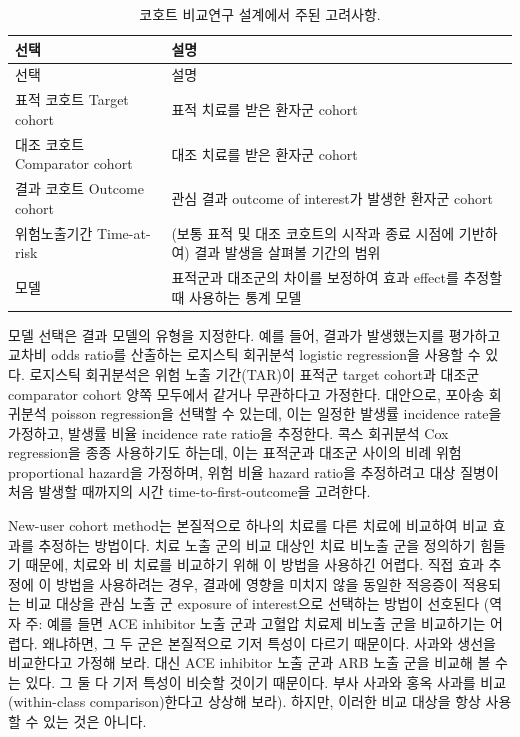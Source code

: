 \documentclass[10.5pt]{book}
\theoremstyle{definition}
\theoremstyle{definition}
\theoremstyle{definition}
\theoremstyle{remark}
\let\BeginKnitrBlock\begin \let\EndKnitrBlock\end
\begin{document}
\begin{longtable}[]{@{}ll@{}}
\caption{\label{tab:cmChoices} 코호트 비교연구 설계에서 주된
고려사항.}\tabularnewline
\toprule
선택 & 설명\tabularnewline
\midrule
\endfirsthead
\toprule
선택 & 설명\tabularnewline
\midrule
\endhead
표적 코호트 Target cohort & 표적 치료를 받은 환자군
cohort\tabularnewline
대조 코호트 Comparator cohort & 대조 치료를 받은 환자군
cohort\tabularnewline
결과 코호트 Outcome cohort & 관심 결과 outcome of interest가 발생한
환자군 cohort\tabularnewline
위험노출기간 Time-at-risk & (보통 표적 및 대조 코호트의 시작과 종료
시점에 기반하여) 결과 발생을 살펴볼 기간의 범위\tabularnewline
모델 & 표적군과 대조군의 차이를 보정하여 효과 effect를 추정할 때
사용하는 통계 모델\tabularnewline
\bottomrule
\end{longtable}

모델 선택은 결과 모델의 유형을 지정한다. 예를 들어, 결과가 발생했는지를
평가하고 교차비 odds ratio를 산출하는 로지스틱 회귀분석 logistic
regression을 사용할 수 있다. 로지스틱 회귀분석은 위험 노출 기간(TAR)이
표적군 target cohort과 대조군 comparator cohort 양쪽 모두에서 같거나
무관하다고 가정한다. 대안으로, 포아송 회귀분석 poisson regression을
선택할 수 있는데, 이는 일정한 발생률 incidence rate을 가정하고, 발생률
비율 incidence rate ratio을 추정한다. 콕스 회귀분석 Cox regression을
종종 사용하기도 하는데, 이는 표적군과 대조군 사이의 비례 위험
proportional hazard을 가정하며, 위험 비율 hazard ratio을 추정하려고 대상
질병이 처음 발생할 때까지의 시간 time-to-first-outcome을 고려한다.
 

\BeginKnitrBlock{rmdimportant}
New-user cohort method는 본질적으로 하나의 치료를 다른 치료에 비교하여
비교 효과를 추정하는 방법이다. 치료 노출 군의 비교 대상인 치료 비노출
군을 정의하기 힘들기 때문에, 치료와 비 치료를 비교하기 위해 이 방법을
사용하긴 어렵다. 직접 효과 추정에 이 방법을 사용하려는 경우, 결과에
영향을 미치지 않을 동일한 적응증이 적용되는 비교 대상을 관심 노출 군
exposure of interest으로 선택하는 방법이 선호된다 (역자 주: 예를 들면
ACE inhibitor 노출 군과 고혈압 치료제 비노출 군을 비교하기는 어렵다.
왜냐하면, 그 두 군은 본질적으로 기저 특성이 다르기 때문이다. 사과와
생선을 비교한다고 가정해 보라. 대신 ACE inhibitor 노출 군과 ARB 노출
군을 비교해 볼 수는 있다. 그 둘 다 기저 특성이 비슷할 것이기 때문이다.
부사 사과와 홍옥 사과를 비교 (within-class comparison)한다고 상상해
보라). 하지만, 이러한 비교 대상을 항상 사용할 수 있는 것은 아니다.
\EndKnitrBlock{rmdimportant}
\end{document}

